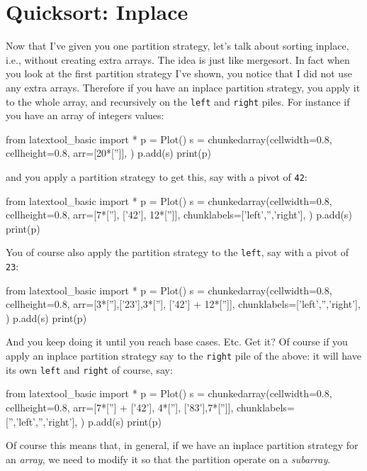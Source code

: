 \section{Quicksort: Inplace}



Now that I've given you one partition strategy, let's talk about
sorting inplace, 
i.e., without creating extra arrays.
The idea is just like mergesort.
In fact when you look at the first partition strategy I've shown,
you notice that I did not use any extra arrays.
Therefore if you have an inplace partition strategy, you apply it to
the whole array, and recursively on the \verb!left! and \verb!right! piles.
For instance if you have an array of integers values:
\begin{python}
from latextool_basic import *
p = Plot()
s = chunkedarray(cellwidth=0.8, 
                 cellheight=0.8,
                 arr=[20*['']],
                )
p.add(s)
print(p)
\end{python}
and you apply a partition strategy to get this, say with a pivot of 
\verb!42!:
\begin{python}
from latextool_basic import *
p = Plot()
s = chunkedarray(cellwidth=0.8,
                 cellheight=0.8,
                 arr=[7*[''], ['42'], 12*['']],
                 chunklabels=['left','','right'],
)
p.add(s)
print(p)
\end{python}

You of course also apply the partition strategy to the \verb!left!,
say with a pivot of \verb!23!:
\begin{python}
from latextool_basic import *
p = Plot()
s = chunkedarray(cellwidth=0.8,
                   cellheight=0.8,
                   arr=[3*[''],['23'],3*[''], ['42'] + 12*['']],
                   chunklabels=['left','','right'],
)
p.add(s)
print(p)
\end{python}
And you keep doing it until you reach base cases.
Etc.
Get it?
Of course if you apply an inplace partition strategy say to the \verb!right!
pile of the above:
it will have its own \verb!left! and \verb!right! of course, say:
\begin{python}
from latextool_basic import *
p = Plot()
s = chunkedarray(cellwidth=0.8,
                   cellheight=0.8,
                   arr=[7*[''] + ['42'], 4*[''], ['83'],7*['']],
                   chunklabels=['','left','','right'],
)
p.add(s)
print(p)
\end{python}

Of course this means that, in general, if we have an 
inplace partition strategy for an \textit{array}, we need to modify it so that
the partition operate on a \textit{subarray}.


